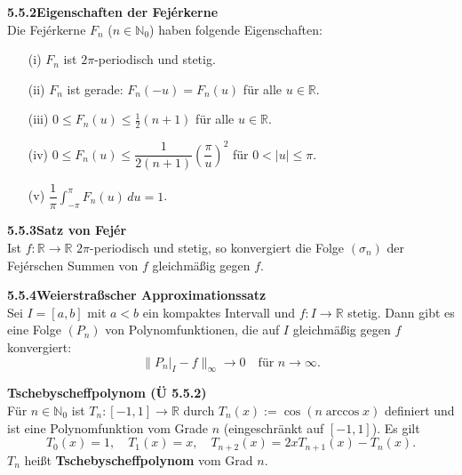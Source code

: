 \documentclass[a4paper,12pt]{article}
\newcommand{\gentry}[3]{%
  \noindent\textbf{#1\quad #2}\nopagebreak\\[0.2em]
  #3\par\smallskip
}
\begin{document}
\gentry{5.5.2}{Eigenschaften der Fejérkerne}{%
  Die Fejérkerne $F_n$ ($n \in \mathbb{N}_0$) haben folgende Eigenschaften:
  \begin{itemize}[topsep=2pt,itemsep=1pt]
    \item[(i)] $F_n$ ist $2\pi$-periodisch und stetig.
    \item[(ii)] $F_n$ ist gerade: $F_n(-u) = F_n(u)$ für alle $u \in \mathbb{R}$.
    \item[(iii)] $0 \leq F_n(u) \leq \frac{1}{2}(n+1)$ für alle $u \in \mathbb{R}$.
    \item[(iv)] $0 \leq F_n(u) \leq \dfrac{1}{2(n+1)} \left(\dfrac{\pi}{u}\right)^2$ für $0 < |u| \leq \pi$.
    \item[(v)] $\dfrac{1}{\pi} \int_{-\pi}^\pi F_n(u)\,du = 1$.
  \end{itemize}
}

\gentry{5.5.3}{Satz von Fejér}{%
  Ist $f: \mathbb{R} \to \mathbb{R}$ $2\pi$-periodisch und stetig, so konvergiert
  die Folge $(\sigma_n)$ der Fejérschen Summen von $f$ gleichmäßig gegen $f$.
}

\gentry{5.5.4}{Weierstraßscher Approximationssatz}{%
  Sei $I = [a,b]$ mit $a<b$ ein kompaktes Intervall und $f: I \to \mathbb{R}$
  stetig. Dann gibt es eine Folge $(P_n)$ von Polynomfunktionen, die auf $I$
  gleichmäßig gegen $f$ konvergiert:
  \[
    \|P_n|_I - f\|_\infty \to 0 \quad \text{für } n \to \infty.
  \]
}

\gentry{}{Tschebyscheffpolynom (Ü 5.5.2)}{%
  Für $n \in \mathbb{N}_0$ ist $T_n: [-1,1] \to \mathbb{R}$ durch
  $T_n(x) := \cos(n \arccos x)$ definiert und ist eine Polynomfunktion vom
  Grade $n$ (eingeschränkt auf $[-1,1]$). Es gilt
  \[
    T_0(x) = 1, \quad T_1(x) = x, \quad T_{n+2}(x) = 2 x T_{n+1}(x) - T_n(x).
  \]
  $T_n$ heißt \textbf{Tschebyscheffpolynom} vom Grad $n$.
}
\end{document}
